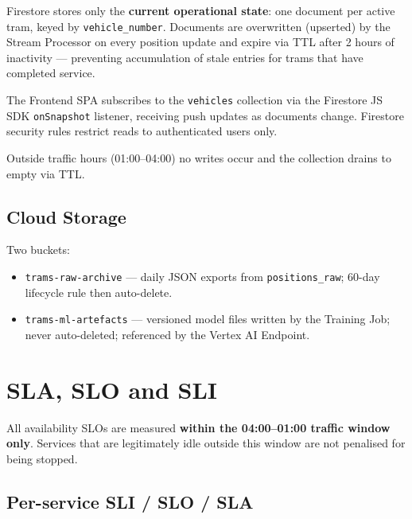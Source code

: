 \documentclass[11pt,a4paper]{article}
\begin{document}
Firestore stores only the \textbf{current operational state}: one document
per active tram, keyed by \texttt{vehicle\_number}. Documents are overwritten
(upserted) by the Stream Processor on every position update and expire via
TTL after 2 hours of inactivity --- preventing accumulation of stale entries
for trams that have completed service.

The Frontend SPA subscribes to the \texttt{vehicles} collection via the
Firestore JS SDK \texttt{onSnapshot} listener, receiving push updates as
documents change. Firestore security rules restrict reads to authenticated
users only.

Outside traffic hours (01:00--04:00) no writes occur and the collection
drains to empty via TTL.

\subsection{Cloud Storage}

Two buckets:
\begin{itemize}[itemsep=2pt]
  \item \texttt{trams-raw-archive} --- daily JSON exports from
    \texttt{positions\_raw}; 60-day lifecycle rule then auto-delete.
  \item \texttt{trams-ml-artefacts} --- versioned model files written by the
    Training Job; never auto-deleted; referenced by the Vertex AI Endpoint.
\end{itemize}

\section{SLA, SLO and SLI}



All availability SLOs are measured \textbf{within the 04:00--01:00 traffic
window only}. Services that are legitimately idle outside this window are not
penalised for being stopped.

\subsection{Per-service SLI / SLO / SLA}
\end{document}
